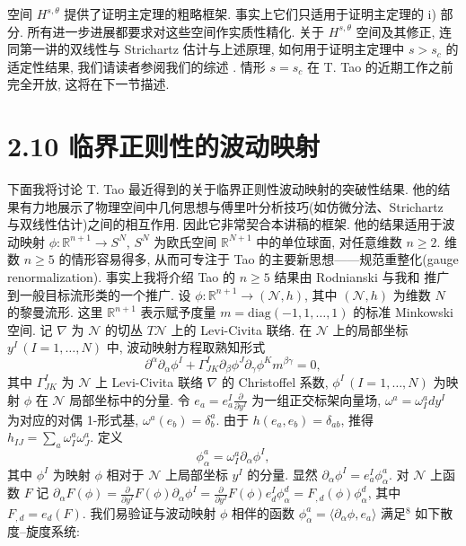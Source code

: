 空间 $H^{s,\theta}$ 提供了证明主定理的粗略框架. 事实上它们只适用于证明主定理的 i) 部分. 所有进一步进展都要求对这些空间作实质性精化. 关于 $H^{s,\theta}$ 空间及其修正, 连同第一讲的双线性与 Strichartz 估计与上述原理, 如何用于证明主定理中 $s > s_c$ 的适定性结果, 我们请读者参阅我们的综述 \cite{klai45}. 情形 $s = s_c$ 在 T. Tao 的近期工作之前完全开放, 这将在下一节描述.
\section*{2.10 临界正则性的波动映射}

下面我将讨论 T. Tao 最近得到的关于临界正则性波动映射的突破性结果. 他的结果有力地展示了物理空间中几何思想与傅里叶分析技巧(如仿微分法、Strichartz 与双线性估计)之间的相互作用. 因此它非常契合本讲稿的框架.
他的结果适用于波动映射 $\phi : \mathbb{R}^{n+1} \to S^N$, $S^N$ 为欧氏空间 $\mathbb{R}^{N+1}$ 中的单位球面, 对任意维数 $n \geq 2$. 维数 $n \geq 5$ 的情形容易得多, 从而可专注于 Tao 的主要新思想------规范重整化(gauge renormalization). 事实上我将介绍 Tao 的 $n \geq 5$ 结果由 Rodnianski 与我和 \cite{klai41} 推广到一般目标流形类的一个推广.
设 $\phi: \mathbb{R}^{n+1} \longrightarrow (\mathcal{N}, h)$, 其中 $(\mathcal{N}, h)$ 为维数 $N$ 的黎曼流形. 这里 $\mathbb{R}^{n+1}$ 表示赋予度量 $m = \mathrm{diag}(-1, 1, \ldots, 1)$ 的标准 Minkowski 空间. 记 $\nabla$ 为 $\mathcal{N}$ 的切丛 $T\mathcal{N}$ 上的 Levi-Civita 联络. 在 $\mathcal{N}$ 上的局部坐标 $y^I\,(I = 1, \ldots, N)$ 中, 波动映射方程取熟知形式
\[
\partial^{\alpha}\partial_{\alpha}\phi^{I}+\Gamma_{J K}^{I}\partial_{\beta}\phi^{J}\partial_{\gamma}\phi^{K}m^{\beta\gamma}=0,
\]
其中 $\Gamma_{JK}^{I}$ 为 $\mathcal{N}$ 上 Levi-Civita 联络 $\nabla$ 的 Christoffel 系数, $\phi^{I}\,(I = 1, \ldots, N)$ 为映射 $\phi$ 在 $\mathcal{N}$ 局部坐标中的分量. 令 $e_{a} = e_{a}^{I} \frac{\partial}{\partial y^{I}}$ 为一组正交标架向量场, $\omega^{a} = \omega_{I}^{a} dy^{I}$ 为对应的对偶 1-形式基, $\omega^{a}(e_{b}) = \delta_{b}^{a}$. 由于 $h(e_{a}, e_{b}) = \delta_{ab}$, 推得 $h_{IJ} = \sum_{a} \omega_{I}^{a} \omega_{J}^{a}$. 定义
\[
\phi_{\alpha}^{a}=\omega_{I}^{a}\partial_{\alpha}\phi^{I},
\]
其中 $\phi^{I}$ 为映射 $\phi$ 相对于 $\mathcal{N}$ 上局部坐标 $y^{I}$ 的分量. 显然 $\partial_{\alpha}\phi^{I} = e_{a}^{I}\phi_{\alpha}^{a}$. 对 $\mathcal{N}$ 上函数 $F$ 记 $\partial_{\alpha}F(\phi) = \frac{\partial}{\partial y^{I}}F(\phi)\partial_{\alpha}\phi^{I} = \frac{\partial}{\partial y^{I}}F(\phi)e_{d}^{I}\phi_{\alpha}^{d} = F_{,d}(\phi)\phi_{\alpha}^{d}$, 其中 $F_{,d} = e_{d}(F)$.
我们易验证与波动映射 $\phi$ 相伴的函数 $\phi_{\alpha}^a = \langle \partial_\alpha \phi, e_a \rangle$ 满足$^{8}$ 如下散度--旋度系统:
